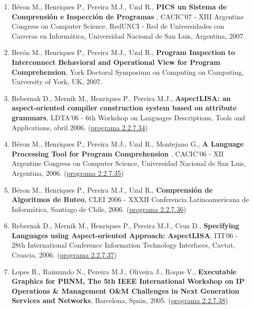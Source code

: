 \documentclass[11pt]{article}
\begin{document}
\begin{enumerate}
\item {Béron M., Henriques P., Pereira M.J., Uzal R., {\bf{ PICS un Sistema de Comprensión e Inspección de Programas}} , CACIC'07 - XIII Argentine Congress on Computer Science, RedUNCI - Red de Universidades con Carreras en Informática, Universidad Nacional de San Luis, Argentina, 2007.}

\item {Berón M., Henriques P., Pereira M.J., Uzal R., {\bf{ Program Inspection to Interconnect Behavioral and Operational View for Program Comprehension}}, York Doctoral Symposium on Computing on Computing, University of York, UK, 2007.}

\item {Rebernak D., Mernik M., Henriques P., Pereira M.J., {\bf{ AspectLISA: an aspect-oriented compiler construction system based on attribute grammars}}, LDTA'06 - 6th Workshop on Languages Descriptions, Tools and Applications, abril 2006. (\href{run:ComunicacoesOrais/programas/LDTA2006prog.pdf}{programa 2.2.7.34})}

\item {Béron M., Henriques P., Pereira M.J., Uzal R., Montejano G., {\bf{ A Language Processing Tool for Program Comprehension}} , CACIC'06 - XII Argentine Congress on Computer Science, Universidad Nacional de San Luis, Argentina, 2006. (\href{run:ComunicacoesOrais/programas/Cacic2006prog.pdf}{programa 2.2.7.35})}

\item {Béron M., Henriques P., Pereira M.J., Uzal R., {\bf{ Comprensión de Algoritmos de Ruteo}}, CLEI 2006 - XXXII Conferencia Latinoamericana de Informática, Santiago de Chile, 2006. (\href{run:ComunicacoesOrais/programas/CLEI2006.pdf}{programa 2.2.7.36})}

\item {Rebernak D., Mernik M., Henriques P., Pereira M.J., Cruz D., {\bf{ Specifying Languages using Aspect-oriented Approach: AspectLISA}}, ITI'06 - 28th International Conference Information Technology Interfaces, Cavtat, Croacia, 2006. (\href{run:ComunicacoesOrais/programas/ITI2006presentation.pdf}{programa 2.2.7.37})}

\item {Lopes R., Raimundo N., Pereira M.J., Oliveira J., Roque V., {\bf{ Executable Graphics for PBNM, The 5th IEEE International Workshop on IP Operations \& Management O\&M Challenges in Next Generation Services and Networks}}, Barcelona, Spain, 2005. (\href{run:ComunicacoesOrais/programas/IPOM05.pdf}{programa 2.2.7.38})}


\end{enumerate}
\end{document}
